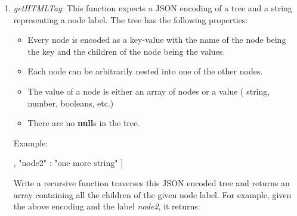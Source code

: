 \begin{enumerate}
\begin{enumerate}
        \item \textit{getHTMLTag}: This function expects a JSON encoding of a
        tree and a string representing a node label. The tree has the
        following properties:
        \begin{itemize}
            \item Every node is encoded as a key-value with the name of the
            node being the key and the children of the node being the values.
            \item Each node can be arbitrarily nested into one of the other
            nodes.
            \item The value of a node is either an array of nodes or a value (
                string, number, booleans, etc.)
            \item There are no \textbf{null}s in the tree.
        \end{itemize}  Example:
        \begin{scalacode}
            [
                "node1" :  [
                    "node2" : "a string",
                    "node2" : "another string"
                ],
                "node2" : "one more string"
            ]
        \end{scalacode}
        Write a recursive function traverses this JSON encoded tree and
        returns an array containing all the children of the given node label.
        For example, given the above encoding and the label \textit{node2},
        it returns:
        \begin{scalacode}
        \end{scalacode}

    \end{enumerate}
\end{enumerate}
